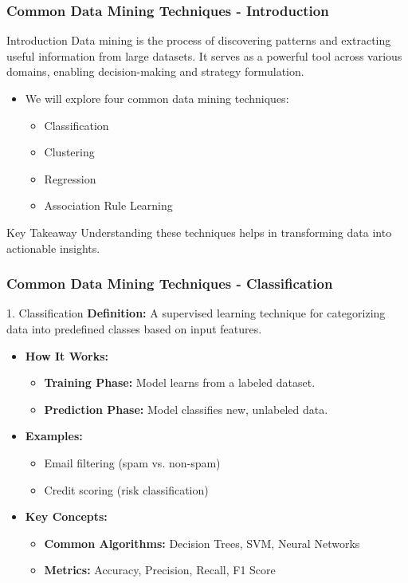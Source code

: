 \documentclass[aspectratio=169]{beamer}
\begin{document}
\begin{frame}[fragile]
    \frametitle{Common Data Mining Techniques - Introduction}
    \begin{block}{Introduction}
        Data mining is the process of discovering patterns and extracting useful information from large datasets. It serves as a powerful tool across various domains, enabling decision-making and strategy formulation.
    \end{block}
    \begin{itemize}
        \item We will explore four common data mining techniques:
        \begin{itemize}
            \item Classification
            \item Clustering
            \item Regression
            \item Association Rule Learning
        \end{itemize}
    \end{itemize}
    \begin{block}{Key Takeaway}
        Understanding these techniques helps in transforming data into actionable insights.
    \end{block}
\end{frame}

\begin{frame}[fragile]
    \frametitle{Common Data Mining Techniques - Classification}
    \begin{block}{1. Classification}
        \textbf{Definition:} A supervised learning technique for categorizing data into predefined classes based on input features.
    \end{block}
    \begin{itemize}
        \item \textbf{How It Works:}
        \begin{itemize}
            \item \textbf{Training Phase:} Model learns from a labeled dataset.
            \item \textbf{Prediction Phase:} Model classifies new, unlabeled data.
        \end{itemize}
        \item \textbf{Examples:}
        \begin{itemize}
            \item Email filtering (spam vs. non-spam)
            \item Credit scoring (risk classification)
        \end{itemize}
        \item \textbf{Key Concepts:}
        \begin{itemize}
            \item \textbf{Common Algorithms:} Decision Trees, SVM, Neural Networks
            \item \textbf{Metrics:} Accuracy, Precision, Recall, F1 Score
        \end{itemize}
    \end{itemize}
\end{frame}
\end{document}
